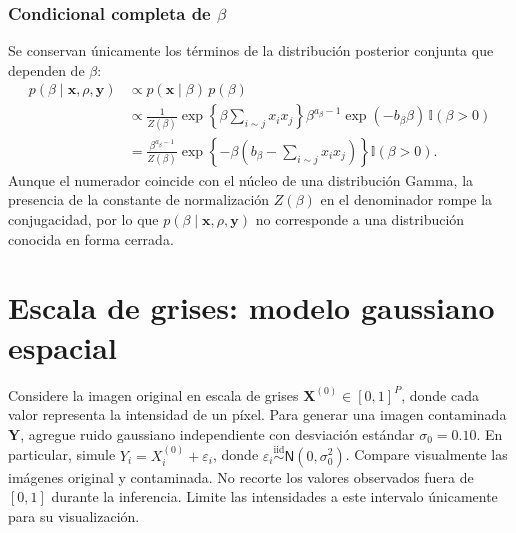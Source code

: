 \documentclass[11pt,a4paper]{article}
\begin{document}
\subsubsection*{Condicional completa de $\beta$}

Se conservan únicamente los términos de la distribución posterior conjunta que dependen de $\beta$:
\begin{align*}
p(\beta \mid \boldsymbol{x}, \rho, \boldsymbol{y}) &\propto p(\boldsymbol{x} \mid \beta)\, p(\beta) \\[6pt]
&\propto \frac{1}{Z(\beta)} \exp\left\{ \beta \sum_{i \sim j} x_i x_j \right\} \beta^{a_\beta - 1} \exp(-b_\beta \beta) \, \mathbb{I}(\beta > 0) \\[6pt]
&= \frac{\beta^{a_\beta - 1}}{Z(\beta)} \exp\left\{ -\beta \left( b_\beta - \sum_{i \sim j} x_i x_j \right) \right\} \mathbb{I}(\beta > 0).
\end{align*}
Aunque el numerador coincide con el núcleo de una distribución Gamma, la presencia de la constante de normalización $Z(\beta)$ en el denominador rompe la conjugacidad, por lo que $p(\beta \mid \boldsymbol{x}, \rho, \boldsymbol{y})$ no corresponde a una distribución conocida en forma cerrada.

\section{Escala de grises: modelo gaussiano espacial}

Considere la imagen original en escala de grises $\boldsymbol{X}^{(0)} \in [0, 1]^P$, donde cada valor representa la intensidad de un píxel. Para generar una imagen contaminada $\boldsymbol{Y}$, agregue ruido gaussiano independiente con desviación estándar $\sigma_0 = 0.10$. En particular, simule $Y_i = X_i^{(0)} + \varepsilon_i$, donde $\varepsilon_i \overset{\text{iid}}{\sim} \textsf{N}(0, \sigma_0^2)$. Compare visualmente las imágenes original y contaminada. No recorte los valores observados fuera de $[0, 1]$ durante la inferencia. Limite las intensidades a este intervalo únicamente para su visualización.
\end{document}
